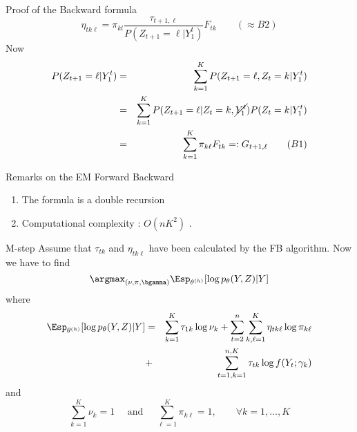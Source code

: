 \documentclass[compress,10pt]{beamer}
\begin{document}
\begin{frame}[allowframebreaks]{Proof of the Backward formula}
 $$\eta_{tk\ell}  = \pi_{kl} \frac{\tau_{t+1,\ell}}{P(Z_{t+1} = \ell|Y_1^t)} F_{tk}\quad \quad (\approx B2) $$
Now
  \begin{eqnarray*} 
P(Z_{t+1} = \ell|Y_1^t) &=& \sum_{k=1}^K P(Z_{t+1} = \ell, Z_t = k|Y_1^t)\\ &=& 
\sum_{k=1}^K P(Z_{t+1} = \ell | Z_t = k,\cancel{Y_1^t})P(Z_t = k |Y_1^t)\\
&=& \sum_{k=1}^K   \pi_{k\ell} {F_{tk}}=: G_{t+1, \ell} \quad \quad (B1)
\end{eqnarray*}
 

\end{frame}


 

 

\begin{frame}{Remarks on the EM Forward Backward}
 
\begin{enumerate}
\item  The formula is a double recursion
 \item Computational complexity : $O(n K^2)$ .  
 \end{enumerate}
\end{frame}


\begin{frame}{M-step}
Assume that $\tau_{tk}$ and $\eta_{tk\ell}$ have been calculated by the FB algorithm. Now we have to find 
$$\argmax_{(\nu,\pi,\bgamma)}\Esp_{\theta^{(h)}}[\log p_\theta(Y, Z) | Y]$$ 
where 
\begin{eqnarray*}
\Esp_{\theta^{(h)}}[\log p_\theta(Y, Z) | Y] &=& \sum_{k=1}^K \tau_{1k} \log \nu_k + \sum_{t=2}^n \sum_{k, \ell=1}^K \eta_{tk\ell} \log \pi_{k\ell} \\
&+& \sum_{t=1, k=1}^{n,K} {\tau_{tk} \log f(Y_t; \gamma_k)}
\end{eqnarray*}
and 
$$\sum_{k=1}^K \nu_k = 1 \quad \mbox{ and }  \quad  \sum_{\ell=1}^K \pi_{k\ell} = 1,\quad \quad \forall k =1, \dots, K$$ 

 
\end{frame} 
\end{document}
